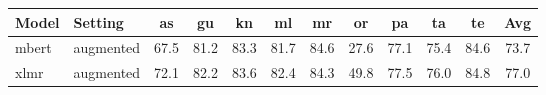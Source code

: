 \begin{tabular}{llcccccccccc}
\toprule
Model & Setting & as & gu & kn & ml & mr & or & pa & ta & te & Avg \\
\midrule
mbert & augmented & 67.5 & 81.2 & 83.3 & 81.7 & 84.6 & 27.6 & 77.1 & 75.4 & 84.6 & 73.7 \\
xlmr & augmented & 72.1 & 82.2 & 83.6 & 82.4 & 84.3 & 49.8 & 77.5 & 76.0 & 84.8 & 77.0 \\
\bottomrule
\end{tabular}
